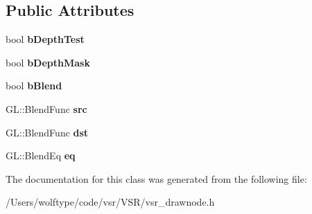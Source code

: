 \subsection*{Public Attributes}
\begin{DoxyCompactItemize}
\item 
\hypertarget{classvsr_1_1_transparency_node_ac8efa5992af1ab935b8b590c70e9f299}{bool {\bfseries b\-Depth\-Test}}\label{classvsr_1_1_transparency_node_ac8efa5992af1ab935b8b590c70e9f299}

\item 
\hypertarget{classvsr_1_1_transparency_node_a7cdbd106bffeef2c2abe0bb9b618facc}{bool {\bfseries b\-Depth\-Mask}}\label{classvsr_1_1_transparency_node_a7cdbd106bffeef2c2abe0bb9b618facc}

\item 
\hypertarget{classvsr_1_1_transparency_node_a303f19e37ad88d475e61cf9af60aff36}{bool {\bfseries b\-Blend}}\label{classvsr_1_1_transparency_node_a303f19e37ad88d475e61cf9af60aff36}

\item 
\hypertarget{classvsr_1_1_transparency_node_a9d9d1a01c2b65f9aae210dfc6bdf3e35}{G\-L\-::\-Blend\-Func {\bfseries src}}\label{classvsr_1_1_transparency_node_a9d9d1a01c2b65f9aae210dfc6bdf3e35}

\item 
\hypertarget{classvsr_1_1_transparency_node_afa53e71a9e15233e078232c0ef247c9e}{G\-L\-::\-Blend\-Func {\bfseries dst}}\label{classvsr_1_1_transparency_node_afa53e71a9e15233e078232c0ef247c9e}

\item 
\hypertarget{classvsr_1_1_transparency_node_a22209d7be1e19f716721bd2a900b8ff4}{G\-L\-::\-Blend\-Eq {\bfseries eq}}\label{classvsr_1_1_transparency_node_a22209d7be1e19f716721bd2a900b8ff4}

\end{DoxyCompactItemize}


The documentation for this class was generated from the following file\-:\begin{DoxyCompactItemize}
\item 
/\-Users/wolftype/code/vsr/\-V\-S\-R/vsr\-\_\-drawnode.\-h\end{DoxyCompactItemize}
